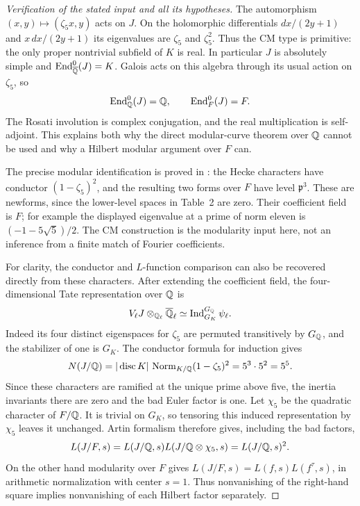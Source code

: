 \begin{proof}[Verification of the stated input and all its hypotheses]
The automorphism $(x,y)\mapsto(\zeta_5x,y)$ acts on $J$. On the
holomorphic differentials $dx/(2y+1)$ and $x\,dx/(2y+1)$ its eigenvalues
are $\zeta_5$ and $\zeta_5^2$. Thus the CM type is primitive: the only
proper nontrivial subfield of $K$ is real. In particular $J$ is absolutely
simple and $\operatorname{End}^0_{\overline{\mathbb Q}}(J)=K$. Galois acts on this
algebra through its usual action on $\zeta_5$, so
\[
 \operatorname{End}^0_\mathbb Q(J)=\mathbb Q,\qquad
 \operatorname{End}^0_F(J)=F.
\]
The Rosati involution is complex conjugation, and the real multiplication
is self-adjoint. This explains both why the direct modular-curve theorem
over $\mathbb Q$ cannot be used and why a Hilbert modular argument over $F$ can.

The precise modular identification is proved in
\citet[p.~439, the paragraph following Table~3]{AMDarmon2000}: the Hecke
characters have conductor $(1-\zeta_5)^2$, and the resulting two forms
over $F$ have level $\mathfrak p^3$. These are newforms, since the
lower-level spaces in Table~2 are zero. Their coefficient field is $F$;
for example the displayed eigenvalue at a prime of norm eleven is
$(-1-5\sqrt5)/2$. The CM construction is the modularity input here,
not an inference from a finite match of Fourier coefficients.

For clarity, the conductor and $L$-function comparison can also be
recovered directly from these characters. After extending the coefficient
field, the four-dimensional Tate representation over $\mathbb Q$ is
\[
 V_\ell J\otimes_{\mathbb Q_\ell}\overline{\mathbb Q}_\ell\simeq
 \operatorname{Ind}_{G_K}^{G_\mathbb Q}\psi_\ell.
\]
Indeed its four distinct eigenspaces for $\zeta_5$ are permuted
transitively by $G_\mathbb Q$, and the stabilizer of one is $G_K$.
The conductor formula for induction gives
\[
 N(J/\mathbb Q)=|\operatorname{disc}K|\,
     \operatorname{Norm}_{K/\mathbb Q}(1-\zeta_5)^2
 =5^3\cdot5^2=5^5.
\]
Since these characters are ramified at the unique prime above five,
the inertia invariants there are zero and the bad Euler factor is one.
Let $\chi_5$ be the quadratic character of $F/\mathbb Q$. It is trivial on
$G_K$, so tensoring this induced representation by $\chi_5$ leaves it
unchanged. Artin formalism therefore gives, including the bad factors,
\[
 L(J/F,s)=L(J/\mathbb Q,s)L(J/\mathbb Q\otimes\chi_5,s)
          =L(J/\mathbb Q,s)^2.
\]
On the other hand modularity over $F$ gives
$L(J/F,s)=L(f,s)L(f^\tau,s)$, in arithmetic normalization with center
$s=1$. Thus nonvanishing of the right-hand square implies nonvanishing
of each Hilbert factor separately.


\end{proof}
